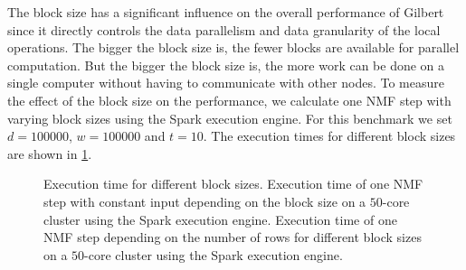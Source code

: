 The block size has a significant influence on the overall performance of Gilbert since it directly controls the data parallelism and data granularity of the local operations.
The bigger the block size is, the fewer blocks are available for parallel computation.
But the bigger the block size is, the more work can be done on a single computer without having to communicate with other nodes.
To measure the effect of the block size on the performance, we calculate one NMF step with varying block sizes using the Spark execution engine.
For this benchmark we set $d=100000$, $w = 100000$ and $t = 10$.
The execution times for different block sizes are shown in \cref{fig:blocksizesNMFStep}.

\begin{figure}
	\centering
	\begin{subfigure}[t]{\dualpgfwidth}
		\caption{}
		\label{fig:blocksizesNMFStep}
	\end{subfigure}
	\begin{subfigure}[t]{\dualpgfwidth}
		\caption{}
		\label{fig:nmfStepDifferentBlocksizes}
	\end{subfigure}
	\caption{Execution time for different block sizes.  Execution time of one NMF step with constant input depending on the block size on a $50$-core cluster using the Spark execution engine.  Execution time of one NMF step depending on the number of rows for different block sizes on a $50$-core cluster using the Spark execution engine.}
	\label{fig:blocksizes}
\end{figure}

